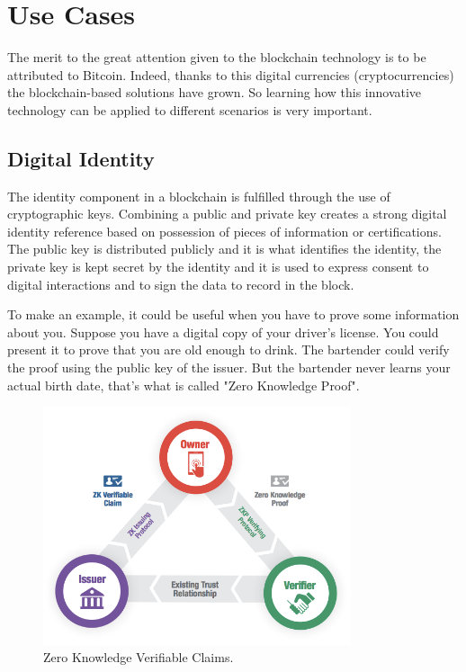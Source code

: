 \section{Use Cases}
\label{sec:usecases}

The merit to the great attention given to the blockchain technology is to be attributed
to Bitcoin. Indeed, thanks to this digital currencies (cryptocurrencies) the 
blockchain-based solutions have grown. So learning how this innovative technology
can be applied to different scenarios is very important. 

\subsection{Digital Identity}
\label{sec:identity}

The identity component in a blockchain is fulfilled through the use of cryptographic keys.
Combining a public and private key creates a strong digital identity reference based 
on possession of pieces of information or certifications. The public key is distributed 
publicly and it is what identifies the identity, the private key is kept secret by
the identity and it is used to express consent to digital interactions and to 
sign the data to record in the block.\cite{coindesk}

To make an example, it could be useful when you have to prove some information 
about you. Suppose you have a digital copy of your driver's license. You 
could present it to prove that you are old enough to drink. The bartender could verify
the proof using the public key of the issuer. But the bartender never learns your
actual birth date, that's what is called "Zero Knowledge Proof".\cite{sovrin}

\begin{figure}[h]
    \centering
    \includegraphics[height=7cm]{identity.png}
    \caption{Zero Knowledge Verifiable Claims.\cite{sovrin}}
    \label{fig:claim}
\end{figure}\pagebreak

